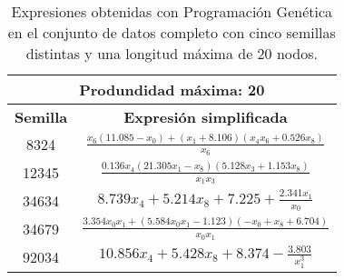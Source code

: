 \begin{table}[H]
\centering
\begin{tabular}{|c|c|}
\hline
\multicolumn{2}{|c|}{\textbf{Produndidad máxima: 20}}                                                                                                          \\ \hline
\textbf{Semilla} & \textbf{Expresión simplificada}                                                                                                             \\ \hline
8324             & $\frac{x_{6} \left(11.085 - x_{0}\right) + \left(x_{1} + 8.106\right) \left(x_{4} x_{6} + 0.526 x_{8}\right)}{x_{6}}$       \\ \hline
12345            & $\frac{0.136 x_{4} \left(21.305 x_{1} - x_{8}\right) \left(5.128 x_{3} + 1.153 x_{8}\right)}{x_{1} x_{3}}$ \\ \hline
34634            & $8.739 x_{4} + 5.214 x_{8} + 7.225 + \frac{2.341 x_{1}}{x_{0}}$                                                         \\ \hline
34679            & $\frac{3.354 x_{0} x_{1} + \left(5.584 x_{0} x_{1} - 1.123\right) \left(- x_{0} + x_{8} + 6.704\right)}{x_{0} x_{1}}$            \\ \hline
92034            & $10.856 x_{4} + 5.428 x_{8} + 8.374 - \frac{3.803}{x_{1}^{3}}$                                                            \\ \hline
\end{tabular}%
\caption{Expresiones obtenidas con Programación Genética en el conjunto de datos completo con cinco semillas distintas y una longitud máxima de 20 nodos.}\label{table:exp_PG_c_20}

\end{table}



